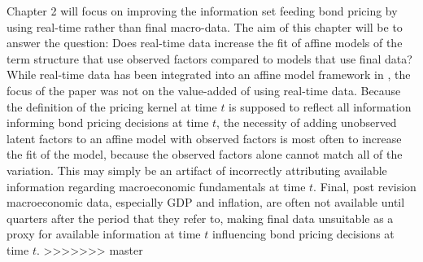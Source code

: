 \documentclass{article}
\numberwithin{equation}{section}
\begin{document}
Chapter 2 will focus on improving the information set feeding bond pricing by
using real-time rather than final macro-data. The aim of this chapter will be
to answer the question: Does real-time data increase the fit of affine models
of the term structure that use observed factors compared to models that use
final data? While real-time data has been integrated into an affine model
framework in \citet{orphanideswei2010}, the focus of the paper was not on the
value-added of using real-time data. Because the definition of the pricing
kernel at time $t$ is supposed to reflect all information informing bond
pricing decisions at time $t$, the necessity of adding unobserved latent
factors to an affine model with observed factors is most often to increase the
fit of the model, because the observed factors alone cannot match all of the
variation. This may simply be an artifact of incorrectly attributing available
information regarding macroeconomic fundamentals at time $t$. Final, post
revision macroeconomic data, especially GDP and inflation, are often not
available until quarters after the period that they refer to, making final data
unsuitable as a proxy for available information at time $t$ influencing bond
pricing decisions at time $t$.
>>>>>>> master
\end{document}
